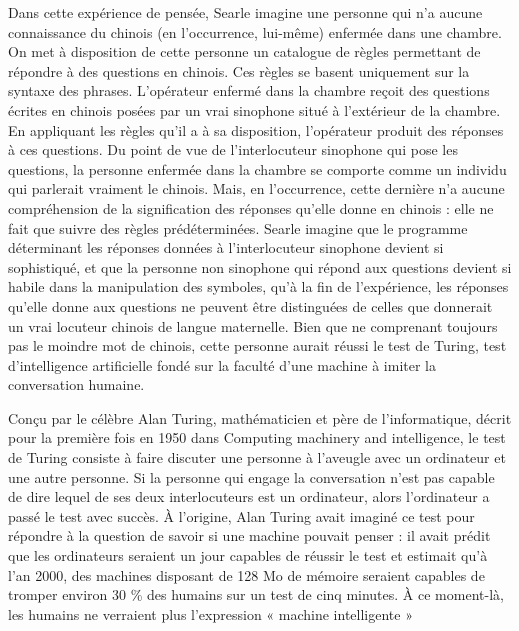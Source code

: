 Dans cette expérience de pensée, Searle imagine une personne qui n’a aucune connaissance du chinois (en l’occurrence, lui-même) enfermée dans une chambre. On met à disposition de cette personne un catalogue de règles permettant de répondre à des questions en chinois. Ces règles se basent uniquement sur la syntaxe des phrases. L'opérateur enfermé dans la chambre reçoit des questions écrites en chinois posées par un vrai sinophone situé à l’extérieur de la chambre. En appliquant les règles qu’il a à sa disposition, l’opérateur produit des réponses à ces questions. Du point de vue de l'interlocuteur sinophone qui pose les questions, la personne enfermée dans la chambre se comporte comme un individu qui parlerait vraiment le chinois. Mais, en l’occurrence, cette dernière n’a aucune compréhension de la signification des réponses qu’elle donne en chinois : elle ne fait que suivre des règles prédéterminées. Searle imagine que le programme déterminant les réponses données à l’interlocuteur sinophone devient si sophistiqué, et que la personne non sinophone qui répond aux questions devient si habile dans la manipulation des symboles, qu’à la fin de l’expérience, les réponses qu’elle donne aux questions ne peuvent être distinguées de celles que donnerait un vrai locuteur chinois de langue maternelle. Bien que ne comprenant toujours pas le moindre mot de chinois, cette personne aurait réussi le test de Turing, test d’intelligence artificielle fondé sur la faculté d’une machine à imiter la conversation humaine.\par


Conçu par le célèbre Alan Turing, mathématicien et père de l’informatique, décrit pour la première fois en 1950 dans Computing machinery and intelligence, le test de Turing consiste à faire discuter une personne à l’aveugle avec un ordinateur et une autre personne. Si la personne qui engage la conversation n’est pas capable de dire lequel de ses deux interlocuteurs est un ordinateur, alors l'ordinateur a passé le test avec succès. À l’origine, Alan Turing avait imaginé ce test pour répondre à la question de savoir si une machine pouvait penser : il avait prédit que les ordinateurs seraient un jour capables de réussir le test et estimait qu’à l’an 2000, des machines disposant de 128 Mo de mémoire seraient capables de tromper environ 30 \% des humains sur un test de cinq minutes. À ce moment-là, les humains ne verraient plus l'expression « machine intelligente »\par

